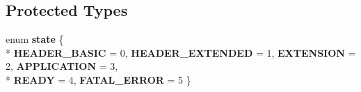 \subsection*{Protected Types}
\begin{DoxyCompactItemize}
\item 
enum {\bfseries state} \{ \\*
{\bfseries H\+E\+A\+D\+E\+R\+\_\+\+B\+A\+S\+IC} = 0, 
{\bfseries H\+E\+A\+D\+E\+R\+\_\+\+E\+X\+T\+E\+N\+D\+ED} = 1, 
{\bfseries E\+X\+T\+E\+N\+S\+I\+ON} = 2, 
{\bfseries A\+P\+P\+L\+I\+C\+A\+T\+I\+ON} = 3, 
\\*
{\bfseries R\+E\+A\+DY} = 4, 
{\bfseries F\+A\+T\+A\+L\+\_\+\+E\+R\+R\+OR} = 5
 \}\hypertarget{classwebsocketpp_1_1processor_1_1hybi13_a56fee5ffbb0b5c2c0708be2338e0740d}{}\label{classwebsocketpp_1_1processor_1_1hybi13_a56fee5ffbb0b5c2c0708be2338e0740d}

\end{DoxyCompactItemize}
